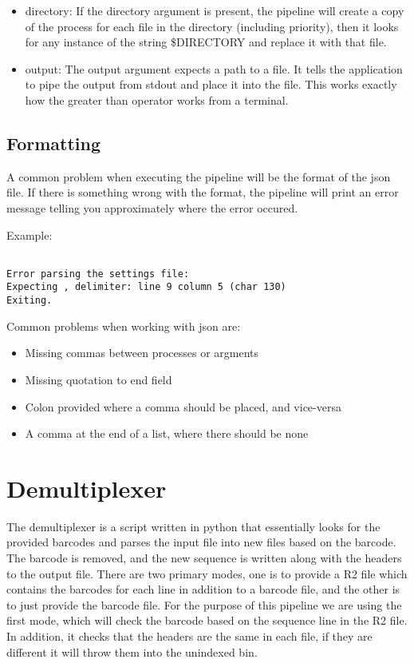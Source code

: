 \documentclass[10pt,a4paper]{article}
\begin{document}
\begin{itemize}
	\item{directory: If the directory argument is present, the pipeline will create a copy of the process for each file in the directory (including priority), then it looks for any instance of the string \$DIRECTORY and replace it with that file.}
	\item{output: The output argument expects a path to a file. It tells the application to pipe the output from stdout and place it into the file. This works exactly how the greater than operator works from a terminal.}
\end{itemize}

\subsection{Formatting}

A common problem when executing the pipeline will be the format of the json file. If there is something wrong with the format, the pipeline will print an error message telling you approximately where the error occured.

Example:
\begin{lstlisting}

Error parsing the settings file:
Expecting , delimiter: line 9 column 5 (char 130)
Exiting.

\end{lstlisting}

Common problems when working with json are:
\begin{itemize}
	\item{Missing commas between processes or argments}
	\item{Missing quotation to end field}
	\item{Colon provided where a comma should be placed, and vice-versa}
	\item{A comma at the end of a list, where there should be none}
\end{itemize}

\section{Demultiplexer}
The demultiplexer is a script written in python that essentially looks for the provided barcodes and parses the input file into new files based on the barcode. The barcode is removed, and the new sequence is written along with the headers to the output file. There are two primary modes, one is to provide a R2 file which contains the barcodes for each line in addition to a barcode file, and the other is to just provide the barcode file. For the purpose of this pipeline we are using the first mode, which will check the barcode based on the sequence line in the R2 file. In addition, it checks that the headers are the same in each file, if they are different it will throw them into the unindexed bin.
\end{document}
